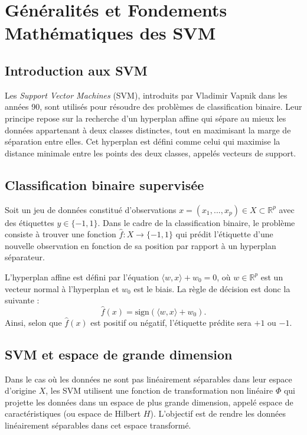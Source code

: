 \documentclass[12pt,a4paper]{report}
\begin{document}
\section{Généralités et Fondements Mathématiques des SVM}

\subsection{Introduction aux SVM}

Les \textit{Support Vector Machines} (SVM), introduits par Vladimir Vapnik dans les années 90, sont utilisés pour résoudre des problèmes de classification binaire. Leur principe repose sur la recherche d'un hyperplan affine qui sépare au mieux les données appartenant à deux classes distinctes, tout en maximisant la marge de séparation entre elles. Cet hyperplan est défini comme celui qui maximise la distance minimale entre les points des deux classes, appelés vecteurs de support.

\subsection{Classification binaire supervisée}

Soit un jeu de données constitué d'observations \( x = (x_1, ..., x_p) \in X \subset \mathbb{R}^p \) avec des étiquettes \( y \in \{−1, 1\} \). Dans le cadre de la classification binaire, le problème consiste à trouver une fonction \( \hat{f} : X \to \{-1, 1\} \) qui prédit l'étiquette d'une nouvelle observation en fonction de sa position par rapport à un hyperplan séparateur.

L'hyperplan affine est défini par l'équation \( \langle w, x \rangle + w_0 = 0 \), où \( w \in \mathbb{R}^p \) est un vecteur normal à l'hyperplan et \( w_0 \) est le biais. La règle de décision est donc la suivante :
\[
\hat{f}(x) = \text{sign}\left(\langle w, x \rangle + w_0\right).
\]
Ainsi, selon que \( \hat{f}(x) \) est positif ou négatif, l'étiquette prédite sera \( +1 \) ou \( -1 \).

\subsection{SVM et espace de grande dimension}

Dans le cas où les données ne sont pas linéairement séparables dans leur espace d'origine \( X \), les SVM utilisent une fonction de transformation non linéaire \( \Phi \) qui projette les données dans un espace de plus grande dimension, appelé espace de caractéristiques (ou espace de Hilbert \( H \)). L'objectif est de rendre les données linéairement séparables dans cet espace transformé.
\end{document}
